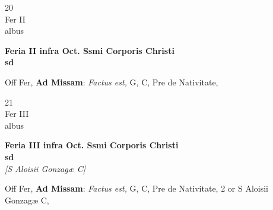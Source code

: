\documentclass[10pt, openany]{book}
\begin{document}
        \begin{center}
            \begin{minipage}{3.5in}
                \vspace{2em}
                \begin{minipage}{0.5in}
                    {\Huge 20} \\
                    {\normalsize Fer II} \\
                    {\normalsize albus}
                \end{minipage}
                \begin{minipage}{3.0in}
                    \textbf{ \large Feria II infra Oct. Ssmi Corporis Christi \\
                    \textnormal{\normalsize sd}} \\ 
                \end{minipage}
                \begin{justify}Off Fer, \textbf{Ad Missam}: \textit{Factus est,} G, C, Pre de Nativitate,   
                \end{justify}
            \end{minipage}
        \end{center}
    
        \begin{center}
            \begin{minipage}{3.5in}
                \vspace{2em}
                \begin{minipage}{0.5in}
                    {\Huge 21} \\
                    {\normalsize Fer III} \\
                    {\normalsize albus}
                \end{minipage}
                \begin{minipage}{3.0in}
                    \textbf{ \large Feria III infra Oct. Ssmi Corporis Christi \\
                    \textnormal{\normalsize sd}} \\ \textit{[S Aloisii Gonzagæ C]} \\ 
                \end{minipage}
                \begin{justify}Off Fer, \textbf{Ad Missam}: \textit{Factus est,} G, C, Pre de Nativitate, 2 or S Aloisii Gonzagæ C,   
                \end{justify}
            \end{minipage}
        \end{center}
    
\end{document}
